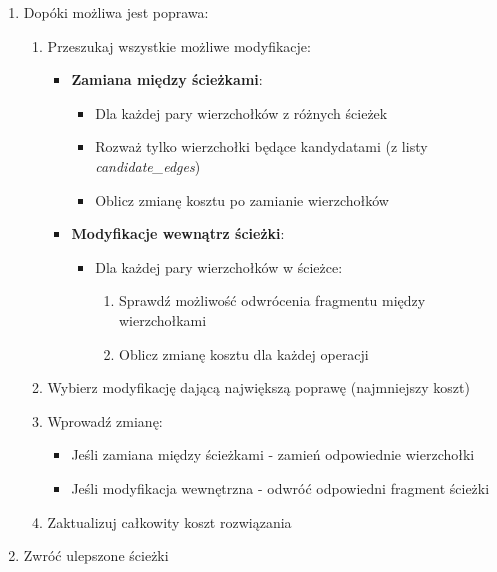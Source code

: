 \documentclass[11pt]{article}
\begin{document}
\begin{enumerate}
\item Dopóki możliwa jest poprawa:
\begin{enumerate}
\item Przeszukaj wszystkie możliwe modyfikacje:
\begin{itemize}
    \item \textbf{Zamiana między ścieżkami}:
    \begin{itemize}
        \item Dla każdej pary wierzchołków z różnych ścieżek
        \item Rozważ tylko wierzchołki będące kandydatami (z listy \textit{candidate_edges})
        \item Oblicz zmianę kosztu po zamianie wierzchołków
    \end{itemize}

  \item \textbf{Modyfikacje wewnątrz ścieżki}:
      \begin{itemize}
        \item Dla każdej pary wierzchołków w ścieżce:
        \begin{enumerate}
          \item Sprawdź możliwość odwrócenia fragmentu między wierzchołkami
          \item Oblicz zmianę kosztu dla każdej operacji
        \end{enumerate}
      \end{itemize}
    \end{itemize}

\item Wybierz modyfikację dającą największą poprawę (najmniejszy koszt)

\item Wprowadź zmianę:
\begin{itemize}
  \item Jeśli zamiana między ścieżkami - zamień odpowiednie wierzchołki
  \item Jeśli modyfikacja wewnętrzna - odwróć odpowiedni fragment ścieżki
\end{itemize}

\item Zaktualizuj całkowity koszt rozwiązania
\end{enumerate}

\item Zwróć ulepszone ścieżki
\end{enumerate}
\end{document}
